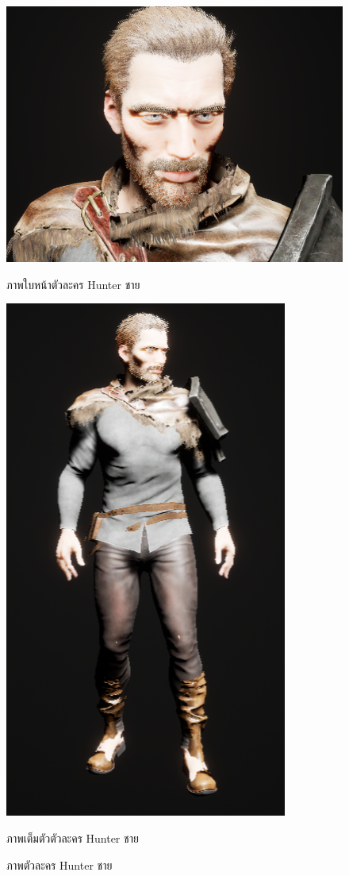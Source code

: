\begin{figure}
  \centering
  \begin{subcaptionblock}{.4\textwidth}
    \centering
    \includegraphics[width=.8\linewidth]{./img/characters/eric_face.png}
    \caption{ภาพใบหน้าตัวละคร Hunter ชาย}\label{ภาพใบหน้าตัวละคร Hunter ชาย}
  \end{subcaptionblock}%
  \begin{subcaptionblock}{.4\textwidth}
    \centering
    \includegraphics[width=.8\linewidth]{./img/characters/eric_full.png}
    \caption{ภาพเต็มตัวตัวละคร Hunter ชาย}\label{ภาพตัวเต็มตัวละคร Hunter ชาย}
  \end{subcaptionblock}%
  \caption{ภาพตัวละคร Hunter ชาย}\label{ภาพตัวละคร Hunter ชาย}
\end{figure}

